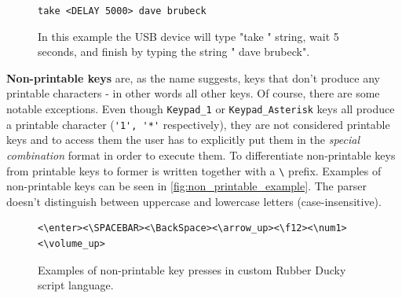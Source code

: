 \begin{figure}[ht]
\centering
\begin{varwidth}{\linewidth}
\verb|take <DELAY 5000> dave brubeck|
\end{varwidth}
\caption{In this example the USB device will type "take " string, wait 5 seconds, and finish by typing the string " dave brubeck".}
\label{fig:delay_example}
\end{figure}

\textbf{Non-printable keys} are, as the name suggests, keys that don't produce any printable characters \-- in other words all other keys. Of course, there are some notable exceptions. Even though \verb|Keypad_1| or \verb|Keypad_Asterisk| keys all produce a printable character (\verb|'1', '*'| respectively), they are not considered printable keys and to access them the user has to explicitly put them in the \emph{special combination} format in order to execute them. To differentiate non-printable keys from printable keys to former is written together with a \verb|\| prefix. Examples of non-printable keys can be seen in \autoref{fig:non_printable_example}. The parser doesn't distinguish between uppercase and lowercase letters (case-insensitive).

\begin{figure}[ht]
\centering
\begin{varwidth}{\linewidth}
\begin{verbatim}
<\enter><\SPACEBAR><\BackSpace><\arrow_up><\f12><\num1><\volume_up>
\end{verbatim}
\end{varwidth}
\caption{Examples of non-printable key presses in custom Rubber Ducky script language.}
\label{fig:non_printable_example}
\end{figure}

